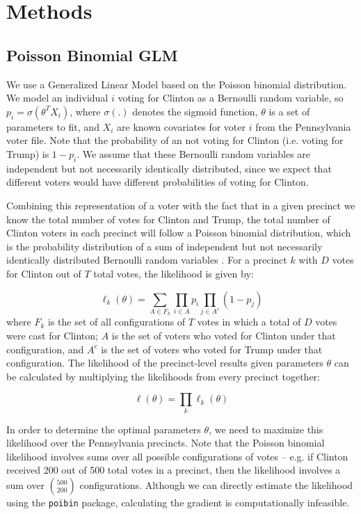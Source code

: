 \documentclass[10pt, letterpaper]{article}
\begin{document}
\section{Methods}

\subsection{Poisson Binomial GLM}

We use a Generalized Linear Model based on the Poisson binomial distribution. We model an individual $i$ voting for Clinton as a Bernoulli random variable, so $p_i = \sigma(\theta^TX_i)$, where $\sigma(.)$ denotes the sigmoid function, $\theta$ is a set of parameters to fit, and $X_i$ are known covariates for voter $i$ from the Pennsylvania voter file. Note that the probability of an not voting for Clinton (i.e. voting for Trump) is $1 - p_i$. We assume that these Bernoulli random variables are independent but not necessarily identically distributed, since we expect that different voters would have different probabilities of voting for Clinton.

Combining this representation of a voter with the fact that in a given precinct we know the total number of votes for Clinton and Trump, the total number of Clinton voters in each precinct will follow a Poisson binomial distribution, which is the probability distribution of a sum of independent but not necessarily identically distributed Bernoulli random variables \cite{Poibi}. For a precinct $k$ with $D$ votes for Clinton out of $T$ total votes, the likelihood is given by:

$$\ell_k(\theta) = \sum_{A \in F_k} \prod_{i \in A} p_i \prod_{j \in A^c}(1 - p_j)$$
where $F_k$ is the set of all configurations of $T$ votes in which a total of $D$ votes were cast for Clinton; $A$ is the set of voters who voted for Clinton under that configuration, and $A^c$ is the set of voters who voted for Trump under that configuration. The likelihood of the precinct-level results given parameters $\theta$ can be calculated by multiplying the likelihoods from every precinct together:

$$\ell(\theta) = \prod_k \ell_k(\theta)$$

In order to determine the optimal parameters $\theta$, we need to maximize this likelihood over the Pennsylvania precincts. Note that the Poisson binomial likelihood involves sums over all possible configurations of votes -- e.g. if Clinton received 200 out of 500 total votes in a precinct, then the likelihood involves a sum over $500 \choose 200$ configurations. Although we can directly estimate the likelihood using the \texttt{poibin} package, calculating the gradient is computationally infeasible.
\end{document}
